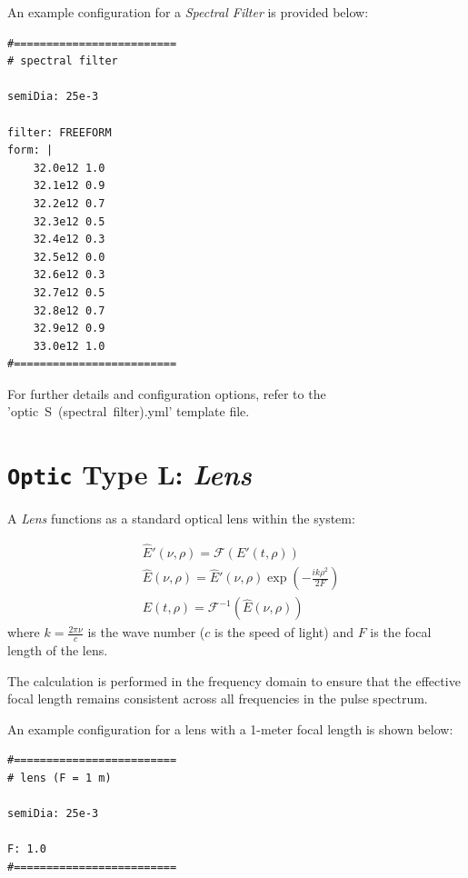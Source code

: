 An example configuration for a \textit{Spectral Filter} is provided below:

\begin{verbatim}
#=========================
# spectral filter

semiDia: 25e-3

filter: FREEFORM
form: |
    32.0e12 1.0
    32.1e12 0.9
    32.2e12 0.7
    32.3e12 0.5
    32.4e12 0.3
    32.5e12 0.0
    32.6e12 0.3
    32.7e12 0.5
    32.8e12 0.7
    32.9e12 0.9
    33.0e12 1.0
#=========================
\end{verbatim}

For further details and configuration options, refer to the 'optic~S~(spectral~filter).yml' template file.



\section{\texttt{Optic} Type L: \textit{Lens}}
A \textit{Lens} functions as a standard optical lens within the system:

\begin{equation}
 \begin{aligned}
  &\widehat{E}'(\nu,\rho) = \mathcal{F}(E'(t,\rho))\\
  &\widehat{E}(\nu,\rho) = \widehat{E}'(\nu,\rho) \exp\left( -\frac{i k \rho^2}{2 F} \right)\\
  &E(t,\rho) = \mathcal{F}^{-1}(\widehat{E}(\nu,\rho))
 \end{aligned}
\end{equation}
where \( k = \frac{2\pi\nu}{c} \) is the wave number (\( c \) is the speed of light) and \( F \) is the focal length of the lens.

The calculation is performed in the frequency domain to ensure that the effective focal length remains consistent across all frequencies in the pulse spectrum.

An example configuration for a lens with a 1-meter focal length is shown below:

\begin{verbatim}
#=========================
# lens (F = 1 m)

semiDia: 25e-3

F: 1.0
#=========================
\end{verbatim}


